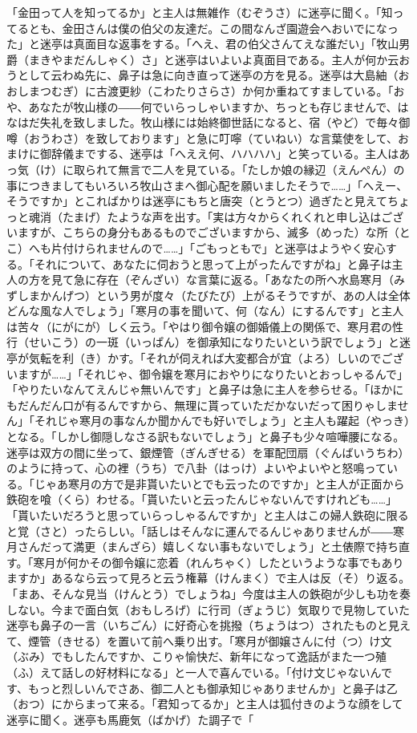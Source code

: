 \documentclass{book}
\begin{document}
「金田って人を知ってるか」と主人は無雑作（むぞうさ）に迷亭に聞く。「知ってるとも、金田さんは僕の伯父の友達だ。この間なんざ園遊会へおいでになった」と迷亭は真面目な返事をする。「へえ、君の伯父さんてえな誰だい」「牧山男爵（まきやまだんしゃく）さ」と迷亭はいよいよ真面目である。主人が何か云おうとして云わぬ先に、鼻子は急に向き直って迷亭の方を見る。迷亭は大島紬（おおしまつむぎ）に古渡更紗（こわたりさらさ）か何か重ねてすましている。「おや、あなたが牧山様の――何でいらっしゃいますか、ちっとも存じませんで、はなはだ失礼を致しました。牧山様には始終御世話になると、宿（やど）で毎々御噂（おうわさ）を致しております」と急に叮嚀（ていねい）な言葉使をして、おまけに御辞儀までする、迷亭は「へええ何、ハハハハ」と笑っている。主人はあっ気（け）に取られて無言で二人を見ている。「たしか娘の縁辺（えんぺん）の事につきましてもいろいろ牧山さまへ御心配を願いましたそうで\ldots{}\ldots{}」「へえー、そうですか」とこればかりは迷亭にもちと唐突（とうとつ）過ぎたと見えてちょっと魂消（たまげ）たような声を出す。「実は方々からくれくれと申し込はございますが、こちらの身分もあるものでございますから、滅多（めった）な所（とこ）へも片付けられませんので\ldots{}\ldots{}」「ごもっともで」と迷亭はようやく安心する。「それについて、あなたに伺おうと思って上がったんですがね」と鼻子は主人の方を見て急に存在（ぞんざい）な言葉に返る。「あなたの所へ水島寒月（みずしまかんげつ）という男が度々（たびたび）上がるそうですが、あの人は全体どんな風な人でしょう」「寒月の事を聞いて、何（なん）にするんです」と主人は苦々（にがにが）しく云う。「やはり御令嬢の御婚儀上の関係で、寒月君の性行（せいこう）の一斑（いっぱん）を御承知になりたいという訳でしょう」と迷亭が気転を利（き）かす。「それが伺えれば大変都合が宜（よろ）しいのでございますが\ldots{}\ldots{}」「それじゃ、御令嬢を寒月におやりになりたいとおっしゃるんで」「やりたいなんてえんじゃ無いんです」と鼻子は急に主人を参らせる。「ほかにもだんだん口が有るんですから、無理に貰っていただかないだって困りゃしません」「それじゃ寒月の事なんか聞かんでも好いでしょう」と主人も躍起（やっき）となる。「しかし御隠しなさる訳もないでしょう」と鼻子も少々喧嘩腰になる。迷亭は双方の間に坐って、銀煙管（ぎんぎせる）を軍配団扇（ぐんばいうちわ）のように持って、心の裡（うち）で八卦（はっけ）よいやよいやと怒鳴っている。「じゃあ寒月の方で是非貰いたいとでも云ったのですか」と主人が正面から鉄砲を喰（くら）わせる。「貰いたいと云ったんじゃないんですけれども\ldots{}\ldots{}」「貰いたいだろうと思っていらっしゃるんですか」と主人はこの婦人鉄砲に限ると覚（さと）ったらしい。「話しはそんなに運んでるんじゃありませんが――寒月さんだって満更（まんざら）嬉しくない事もないでしょう」と土俵際で持ち直す。「寒月が何かその御令嬢に恋着（れんちゃく）したというような事でもありますか」あるなら云って見ろと云う権幕（けんまく）で主人は反（そ）り返る。「まあ、そんな見当（けんとう）でしょうね」今度は主人の鉄砲が少しも功を奏しない。今まで面白気（おもしろげ）に行司（ぎょうじ）気取りで見物していた迷亭も鼻子の一言（いちごん）に好奇心を挑撥（ちょうはつ）されたものと見えて、煙管（きせる）を置いて前へ乗り出す。「寒月が御嬢さんに付（つ）け文（ぶみ）でもしたんですか、こりゃ愉快だ、新年になって逸話がまた一つ殖（ふ）えて話しの好材料になる」と一人で喜んでいる。「付け文じゃないんです、もっと烈しいんでさあ、御二人とも御承知じゃありませんか」と鼻子は乙（おつ）にからまって来る。「君知ってるか」と主人は狐付きのような顔をして迷亭に聞く。迷亭も馬鹿気（ばかげ）た調子で「
\end{document}
